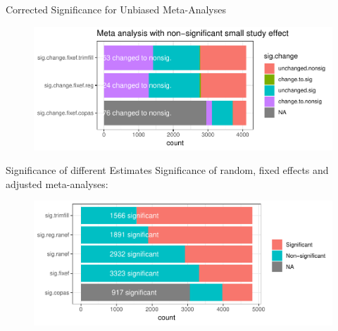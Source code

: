 \documentclass[english]{beamer}\usepackage[]{graphicx}\usepackage[]{color}
\makeatletter
\def\maxwidth{ %
  \ifdim\Gin@nat@width>\linewidth
    \linewidth
  \else
    \Gin@nat@width
  \fi
}
\newenvironment{knitrout}{}{} %
\makeatother
\begin{document}
\begin{frame}{Corrected Significance for Unbiased Meta-Analyses}

\begin{figure}[fragile]
\begin{knitrout}
\color{fgcolor}
\includegraphics[width=\maxwidth]{figure/unnamed-chunk-9-1} 

\end{knitrout}
\end{figure}

\end{frame}


\begin{frame}{Significance of different Estimates}
Significance of random, fixed effects and adjusted meta-analyses:

\begin{figure}[fragile]
\begin{knitrout}
\color{fgcolor}
\includegraphics[width=\maxwidth]{figure/unnamed-chunk-10-1} 

\end{knitrout}
\end{figure}

\end{frame}
\end{document}
